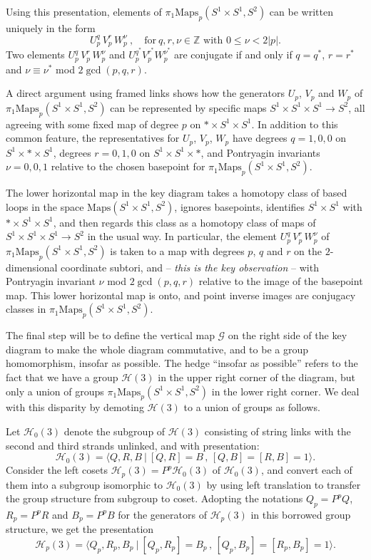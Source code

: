 \documentclass[11pt]{amsart}
\theoremstyle{definition}
\def\bz{\mathbb Z}
\def\calg{\mathcal G}
\def\calh{\mathcal H}
\def\M{\text{Maps}(S^1\times S^1,S^2)}
\def\Mp{\text{Maps}_p(S^1\times S^1,S^2)}
\begin{document}
Using this presentation, elements of $\pi_1\Mp$ can be written uniquely in the form
\[
U_p^q\, V_p^r\, W_p^\nu  \ , \quad \text{for} \ q,r,\nu\in\bz \text{ with } 0 \leq \nu < 2|p|.
\]
Two elements $U_p^q \, V_p^r \, W_p^\nu$ and $U_p^{q^*} V_p^{r^*} W_p^{\nu^*}$ are conjugate if and only if $q = q^*$, $r = r^*$ and $\nu \equiv \nu^*$ mod $2\gcd(p,q,r)$.

A direct argument using framed links shows how the generators $U_p$, $V_p$ and $W_p$ of $\pi_1\Mp$ can be represented by specific maps $S^1 \times S^1 \times S^1 \to S^2$,  all agreeing with some fixed map of degree $p$ on $* \times S^1 \times S^1$.  In addition to this common feature, the representatives for $U_p$, $V_p$, $W_p$ have degrees $q = 1, 0, 0$ on $S^1 \times * \times S^1$, degrees $r = 0, 1, 0$ on $S^1 \times S^1 \times *$,  and Pontryagin invariants $\nu = 0, 0, 1$ relative to the chosen basepoint for $\pi_1\Mp$.

The lower horizontal map in the key diagram takes a homotopy class of based loops in the space $\M$,  ignores basepoints, identifies  $S^1 \times S^1$ with $* \times S^1 \times S^1$,  and then regards this class as a homotopy class of maps of $S^1 \times S^1 \times S^1 \to S^2$ in the usual way.  In particular, the element $U_p^q \, V_p^r \, W_p^\nu$ of  $\pi_1\Mp$ is taken to a map with degrees $p$, $q$ and $r$ on the $2$-dimensional coordinate subtori, and -- {\sl this is the key observation} -- with Pontryagin invariant  $\nu$ mod $2\gcd(p,q,r)$ relative to the image of the basepoint map.  This lower horizontal map is onto, and point inverse images are conjugacy classes in $\pi_1 \Mp$.

The final step will be to define the vertical map $\calg$ on the right side of the key diagram to make the whole diagram commutative, and to be a group homomorphism, insofar as possible.  The hedge ``insofar as possible'' refers to the fact that we have a group $\calh(3)$ in the upper right corner of the diagram, but only a union of groups $\pi_1 \text{Maps}_p(S^1 \times S^1, S^2)$ in the lower right corner.  We deal with this disparity by demoting $\calh(3)$ to a union of groups as follows.

Let $\calh_0(3)$ denote the subgroup of $\calh(3)$ consisting of string links with the second and third strands unlinked, and with presentation:
\[
\calh_0(3) = \langle Q,R,B \ | \ [Q,R] = B\,,\,[Q,B] = [R,B] = 1 \rangle.
\]
Consider the left cosets $\calh_p(3) = P^p \calh_0(3)$  of $\calh_0(3)$,  and convert each of them into a subgroup isomorphic to $\calh_0(3)$ by using left translation to transfer the group structure from subgroup to coset.  Adopting the notations $Q_p = P^p Q$, $R_p = P^p R$ and $B_p = P^p B$  for the generators of $\calh_p(3)$ in this borrowed group structure, we get the presentation
\[
\calh_p(3) = \langle Q_p, R_p, B_p \ | \ [Q_p,R_p] = B_p\,,\,[Q_p,B_p] = [R_p,B_p] = 1 \rangle.
\]
\end{document}
